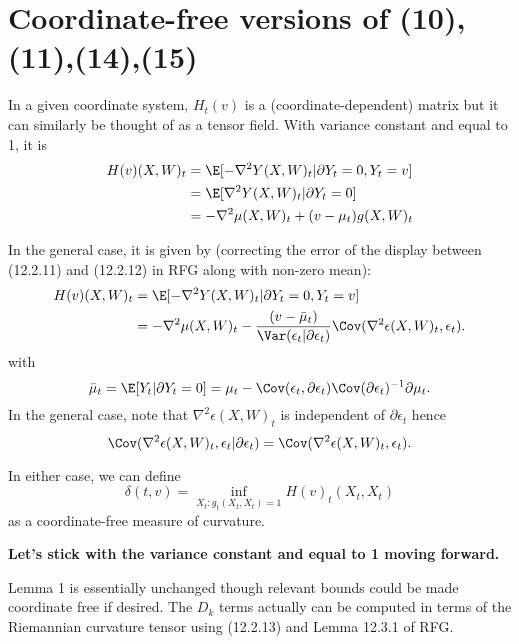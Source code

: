 \documentclass{article}
\begin{document}

\section{Coordinate-free versions of (10),(11),(14),(15)}

In a given coordinate system, $H_t(v)$ is a (coordinate-dependent) matrix but it can similarly
be thought of as a tensor field. With variance constant and equal to 1, it is
$$
\begin{aligned}
  H(v)(X, W)_t &= \E[-\nabla^2 Y(X, W)_t | \partial Y_t=0, Y_t=v] \\
  &= \E[\nabla^2 Y(X, W)_t | \partial Y_t=0] \\
  &=- \nabla^2 \mu(X, W)_t + (v-\mu_t)g(X, W)_t
\end{aligned}
$$

In the general case, it is given by (correcting the error of the display between (12.2.11) and (12.2.12) in RFG along with non-zero mean):
$$
\begin{aligned}
  H(v)(X, W)_t &= \E[-\nabla^2 Y(X, W)_t | \partial Y_t=0, Y_t=v] \\
  &= -\nabla^2 \mu(X, W)_t - \frac{(v-\bar{\mu}_t)}{\text{\Var}(\epsilon_t|\partial \epsilon_t)} \Cov(\nabla^2 \epsilon(X, W)_t, \epsilon_t).
\end{aligned}
$$
with
$$
\bar{\mu}_t = \E[Y_t|\partial Y_t=0] = \mu_t - \Cov(\epsilon_t,\partial \epsilon_t) \Cov(\partial \epsilon_t)^{-1} \partial \mu_t.
$$
In the general case, note that $\nabla^2 \epsilon(X, W)_t$ is independent of $\partial \epsilon_t$ hence
$$
\Cov(\nabla^2 \epsilon(X, W)_t, \epsilon_t | \partial \epsilon_t) = \Cov(\nabla^2 \epsilon(X, W)_t, \epsilon_t).
$$

In either case, we can define
$$
\delta(t,v) = \inf_{X_t: g_t(X_t,X_t)=1} H(v)_t(X_t,X_t)
$$
as a coordinate-free measure of curvature.

{\bf Let's stick with the variance constant and equal to 1 moving forward.}

Lemma 1 is essentially unchanged though relevant bounds could be made coordinate free if desired.
The $D_k$ terms actually can be computed in terms of the Riemannian curvature tensor using
(12.2.13) and Lemma 12.3.1 of RFG.
\end{document}
